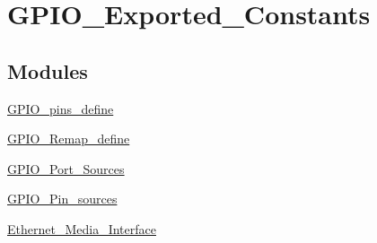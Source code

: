 \hypertarget{group__GPIO__Exported__Constants}{
\section{GPIO\_\-Exported\_\-Constants}
\label{group__GPIO__Exported__Constants}
}
\subsection*{Modules}
\begin{DoxyCompactItemize}
\item 
\hyperlink{group__GPIO__pins__define}{GPIO\_\-pins\_\-define}
\item 
\hyperlink{group__GPIO__Remap__define}{GPIO\_\-Remap\_\-define}
\item 
\hyperlink{group__GPIO__Port__Sources}{GPIO\_\-Port\_\-Sources}
\item 
\hyperlink{group__GPIO__Pin__sources}{GPIO\_\-Pin\_\-sources}
\item 
\hyperlink{group__Ethernet__Media__Interface}{Ethernet\_\-Media\_\-Interface}
\end{DoxyCompactItemize}
